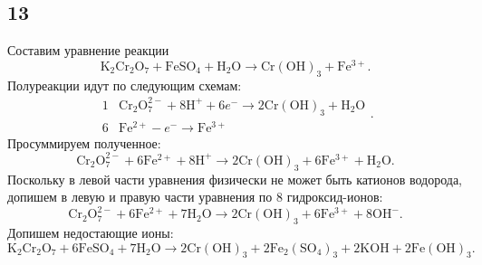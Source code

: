 \subsection{13}

Составим уравнение реакции
\[
\mathrm{K_2Cr_2O_7}+\mathrm{FeSO_4}+\mathrm{H_2O}\longrightarrow\mathrm{Cr(OH)_3}+\mathrm{Fe^{3+}}.
\]
Полуреакции идут по следующим схемам:
\[
\begin{array}{r|l}
	1 & \mathrm{Cr_2O_7^{2-}}+8\mathrm{H^+}+6e^-\longrightarrow2\mathrm{Cr(OH)_3}+\mathrm{H_2O} \\
	6 & \mathrm{Fe^{2+}}-e^-\longrightarrow\mathrm{Fe^{3+}}
\end{array}.
\]
Просуммируем полученное:
\[
\mathrm{Cr_2O_7^{2-}}+6\mathrm{Fe^{2+}}+8\mathrm{H^+}\longrightarrow2\mathrm{Cr(OH)_3}+6\mathrm{Fe^{3+}}+\mathrm{H_2O}.
\]
Поскольку в левой части уравнения физически не может быть катионов водорода, допишем в левую и правую части уравнения по $8$ гидроксид-ионов:
\[
\mathrm{Cr_2O_7^{2-}}+6\mathrm{Fe^{2+}}+7\mathrm{H_2O}\longrightarrow2\mathrm{Cr(OH)_3}+6\mathrm{Fe^{3+}}+8\mathrm{OH^-}.
\]
Допишем недостающие ионы:
\[
\mathrm{K_2Cr_2O_7}+6\mathrm{FeSO_4}+7\mathrm{H_2O}\longrightarrow2\mathrm{Cr(OH)_3}+2\mathrm{Fe_2(SO_4)_3}+2\mathrm{KOH}+2\mathrm{Fe(OH)_3}.
\]